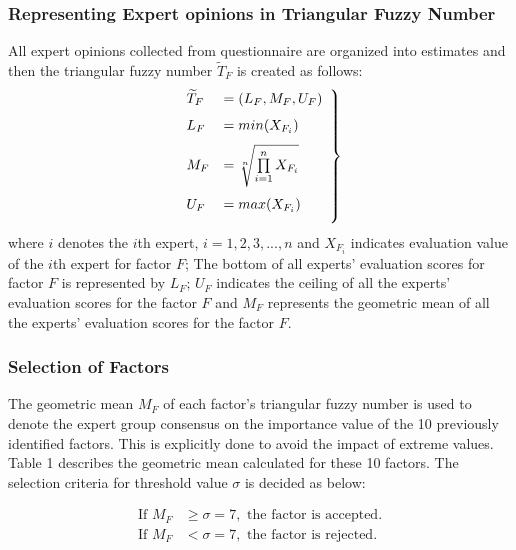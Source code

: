 \documentclass{ws-ijufks}
\begin{document}
\subsubsection{Representing Expert opinions in Triangular Fuzzy Number}        
All expert opinions collected from questionnaire are organized into estimates and then the triangular fuzzy number $ 
\widetilde{T}_F$ is created as follows:
\begin{equation}
\begin{aligned}
\left. \begin{array}{ll}
\vspace{0.25cm}
\widetilde{T}_F&=(L_F,M_F,U_F)\\
\vspace{0.25cm}
L_F&=min({X_{F_i}})\\
\vspace{0.25cm}
M_F&=\sqrt[n]{\prod \limits_{i=1}^{n}X_{F_i}}\\
\vspace{0.25cm}
U_F&=max({X_{F_i}})
\end{array}\right\}
\end{aligned}
\end{equation}
where $i$ denotes the $i$th expert, $i=1,2,3,...,n$ and ${X_{F_i}}$ indicates evaluation value of the $i$th expert for 
factor $F$; The bottom of all experts' evaluation scores for factor $F$ is represented by $L_F$; $U_F$ indicates the 
ceiling of all the experts' evaluation scores for the factor $F$ and $M_F$ represents the geometric mean of all the 
experts' evaluation scores for the factor $F$.

\subsubsection{Selection of Factors}
The geometric mean $M_F$ of each factor's triangular fuzzy number is used to denote the expert group consensus on the 
importance value of the 10 previously identified factors. This is explicitly done to avoid the impact of extreme 
values. Table 1 describes the geometric mean calculated for these 10 factors. The selection 
criteria for threshold value $\sigma$ is decided as below:

\begin{equation*}
	\begin{aligned}
		\text{If } M_F &\geq \sigma = 7 , \text{ the factor is accepted.}\\
		\text{If } M_F &< \sigma = 7 , \text{ the factor is rejected.}
	\end{aligned}
\end{equation*}
\end{document}
